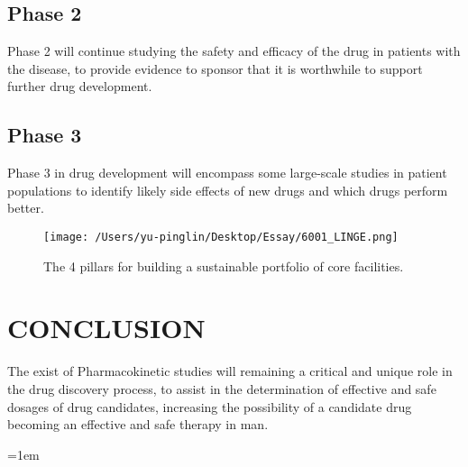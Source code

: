 \documentclass[12pt]{article}
\begin{document}
\subsection{Phase 2}
Phase 2 will continue studying the safety and efficacy of the drug in patients with the disease, to provide evidence to sponsor that it is worthwhile to support further drug development.
\subsection{Phase 3}
Phase 3 in drug development will encompass some large-scale studies in patient populations to identify likely side effects of new drugs and which drugs perform better. 



\begin{figure}[H]
    \texttt{[image: /Users/yu-pinglin/Desktop/Essay/6001\_LINGE.png]}
    \centering
    \caption{The 4 pillars for building a sustainable portfolio of
    core facilities.}
\end{figure}
\section{CONCLUSION}
The exist of Pharmacokinetic studies will remaining a critical and unique role in the drug discovery process, to assist in the determination of effective and safe dosages of drug candidates, increasing the possibility of a candidate drug becoming an effective and safe therapy in man. 

\emergencystretch=1em
\printbibliography[title=Reference]
\end{document}
